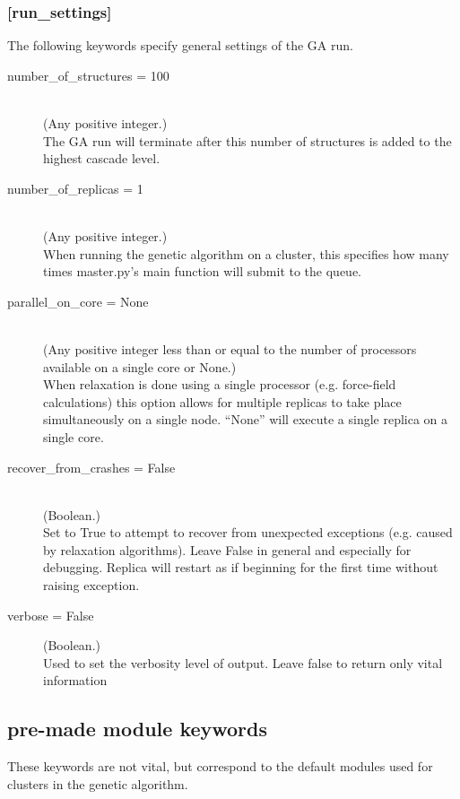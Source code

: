 \subsubsection{[run\_settings]}
		The following keywords specify general settings of the GA run.
\begin{description}
		\item[number\_of\_structures = 100]~\\
			(Any positive integer.)\\
			The GA run will terminate after this number of structures is added to the highest cascade level.
		\item[number\_of\_replicas = 1]~\\
			(Any positive integer.)\\
			When running the genetic algorithm on a cluster, this specifies how many times master.py's main function will submit to the queue.
		\item[parallel\_on\_core = None]~\\
			(Any positive integer less than or equal to the number of processors available on a single core or None.)\\
			When relaxation is done using a single processor (e.g. force-field calculations) this option allows for multiple replicas to take place simultaneously on a single node. ``None'' will execute a single replica on a single core.
		\item[recover\_from\_crashes = False]~\\
			(Boolean.)\\
			Set to True to attempt to recover from unexpected exceptions (e.g. caused by relaxation algorithms). Leave False in general and especially for debugging. Replica will restart as if beginning for the first time without raising exception.
		\item[verbose = False]
			(Boolean.)\\
			Used to set the verbosity level of output. Leave false to return only vital information
\end{description}


\subsection{pre-made module keywords}
		These keywords are not vital, but correspond to the default modules used for clusters in the genetic algorithm.

